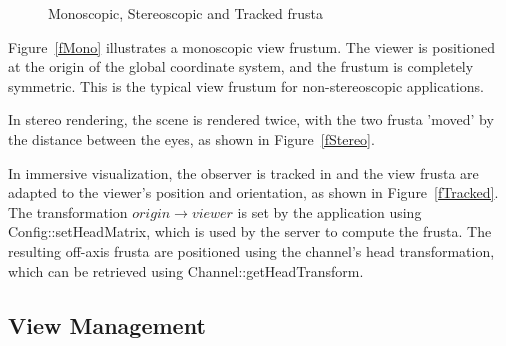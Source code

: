 \documentclass[10pt,a4]{scrartcl}
\newcommand{\fig}[1]{Figure~\ref{#1}}
\begin{document}
\begin{figure}[h!t]
  \hfil
  \hfil
  {\caption{\small\label{fImmersive}Monoscopic, Stereoscopic and Tracked
    frusta}}
\end{figure}

\fig{fMono} illustrates a monoscopic view frustum. The viewer is
positioned at the origin of the global coordinate system, and the
frustum is completely symmetric. This is the typical view frustum for
non-stereoscopic applications.

In stereo rendering, the scene is rendered twice, with the two frusta
'moved' by the distance between the eyes, as shown in \fig{fStereo}.

In immersive visualization, the observer is tracked in and the view
frusta are adapted to the viewer's position and orientation, as shown
in \fig{fTracked}. The transformation $origin \rightarrow viewer$ is set by
the application using \textsf{Config::setHead\-Matrix}, which is used by
the server to compute the frusta. The resulting off-axis frusta are
positioned using the channel's head transformation, which can be
retrieved using \textsf{Channel::getHeadTransform}.


\subsection{\label{sView}View Management}
\end{document}
